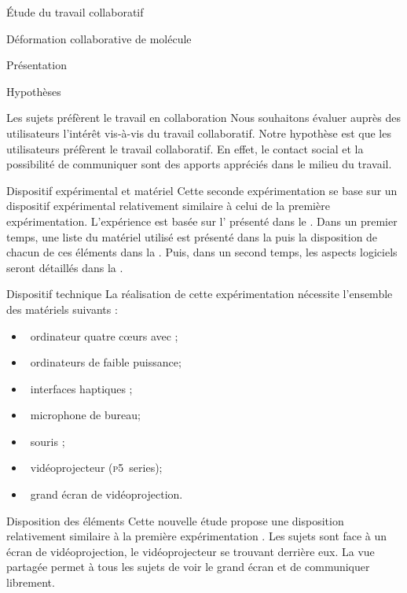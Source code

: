 \documentclass[myfrancais]{mythesis}
\begin{document}
\begin{mypart}{Étude du travail collaboratif}
\begin{mychapter}{Déformation collaborative de molécule}
\begin{mysection}{Présentation}
\begin{mysubsection}{Hypothèses}
\begin{myparagraph}{ Les sujets préfèrent le travail en collaboration}
						Nous souhaitons évaluer auprès des utilisateurs l'intérêt vis-à-vis du travail collaboratif.
						Notre hypothèse est que les utilisateurs préfèrent le travail collaboratif.
						En effet, le contact social et la possibilité de communiquer sont des apports appréciés dans le milieu du travail.
					\end{myparagraph}
				\end{mysubsection}
			\end{mysection}
			\begin{mysection}{Dispositif expérimental et matériel}
				Cette seconde expérimentation se base sur un dispositif expérimental relativement similaire à celui de la première expérimentation.
				L'expérience est basée sur l' présenté dans le .
				Dans un premier temps, une liste du matériel utilisé est présenté dans la  puis la disposition de chacun de ces éléments dans la .
				Puis, dans un second temps, les aspects logiciels seront détaillés dans la .
				\begin{mysubsection}{Dispositif technique}
					La réalisation de cette expérimentation nécessite l'ensemble des matériels suivants :
					\begin{itemize}
						\item {}~ordinateur quatre cœurs \myIntelCore avec ;
						\item {}~ordinateurs de faible puissance;
						\item {}~interfaces haptiques \myOmni;
						\item {}~microphone de bureau;
						\item {}~souris \myThreeD \mySpaceNavigator;
						\item {}~vidéoprojecteur \myACER (\textsc{p5}~series);
						\item {}~grand écran de vidéoprojection.
					\end{itemize}
				\end{mysubsection}
				\begin{mysubsection}{Disposition des éléments}
					Cette nouvelle étude propose une disposition relativement similaire à la première expérimentation .
					Les sujets sont face à un écran de vidéoprojection, le vidéoprojecteur se trouvant derrière eux.
					La vue partagée permet à tous les sujets de voir le grand écran et de communiquer librement.


\end{mysubsection}
\end{mysection}
\end{mychapter}
\end{mypart}
\end{document}
